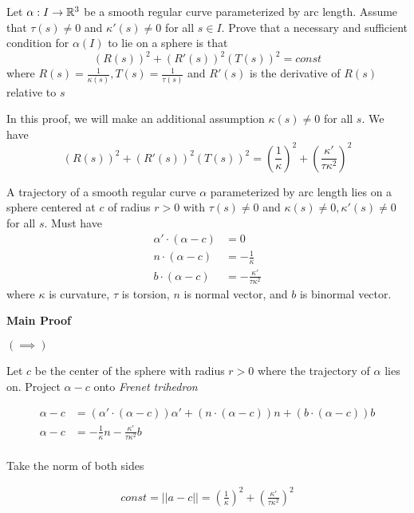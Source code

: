 \documentclass{article}
\begin{document}
\begin{problem}
    Let $\alpha: I \to \mathbb{R}^3$ be a smooth regular curve parameterized by arc length. Assume that $\tau(s) \neq 0$ and $\kappa'(s) \neq 0$ for all $s \in I$. Prove that a necessary and sufficient condition for $\alpha(I)$ to lie on a sphere is that 
    $$
        (R(s))^2 + (R'(s))^2 (T(s))^2 = const
    $$
    where $R(s) = \frac{1}{\kappa(s)}, T(s) = \frac{1}{\tau(s)}$ and $R'(s)$ is the derivative of $R(s)$ relative to $s$
\end{problem}



In this proof, we will make an additional assumption $\kappa(s) \neq 0$ for all $s$. We have
$$
    (R(s))^2 + (R'(s))^2 (T(s))^2 = \left(\frac{1}{\kappa}\right)^2 + \left(\frac{\kappa'}{\tau \kappa^2}\right)^2
$$

\begin{lemma}
    \label{s2}
    A trajectory of a smooth regular curve $\alpha$ parameterized by arc length lies on a sphere centered at $c$ of radius $r > 0$ with $\tau(s) \neq 0$ and $\kappa(s) \neq 0, \kappa'(s) \neq 0$ for all $s$. Must have
    \begin{align}
        \alpha' \cdot (\alpha - c) &= 0 \\
        n \cdot (\alpha - c) &= -\frac{1}{\kappa} \\
        b \cdot (\alpha - c) &= - \frac{\kappa'}{\tau \kappa^2}
    \end{align}
    where $\kappa$ is curvature, $\tau$ is torsion, $n$ is normal vector, and $b$ is binormal vector.
\end{lemma}

\textbf{Main Proof}

$(\implies)$

Let $c$ be the center of the sphere with radius $r > 0$ where the trajectory of $\alpha$ lies on. Project $\alpha - c$ onto \emph{Frenet trihedron}

\begin{align*}
    \alpha - c &= (\alpha' \cdot (\alpha - c)) \alpha' + (n \cdot (\alpha - c)) n + (b \cdot (\alpha - c)) b \\
    \alpha - c &= -\frac{1}{\kappa} n - \frac{\kappa'}{\tau \kappa^2} b \\
\end{align*}

Take the norm of both sides

\begin{align*}
    const = ||a - c|| = \left(\frac{1}{\kappa}\right)^2 + \left(\frac{\kappa'}{\tau \kappa^2}\right)^2
\end{align*}
\end{document}
